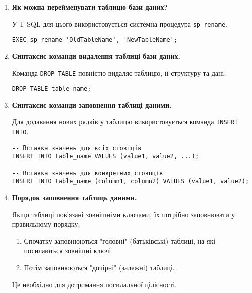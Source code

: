 \documentclass{article}
\begin{document}
\begin{enumerate}[label=\arabic*., leftmargin=*]
        \item \textbf{Як можна перейменувати таблицю бази даних?}

        У T-SQL для цього використовується системна процедура \texttt{sp\_rename}.
        \begin{CodeBox}[Синтаксис]
        \begin{verbatim}
EXEC sp_rename 'OldTableName', 'NewTableName';
        \end{verbatim}
        \end{CodeBox}
        
        \item \textbf{Синтаксис команди видалення таблиці бази даних.}

        Команда \texttt{DROP TABLE} повністю видаляє таблицю, її структуру та дані.
        \begin{CodeBox}[Синтаксис]
        \begin{verbatim}
DROP TABLE table_name;
        \end{verbatim}
        \end{CodeBox}
        
        \item \textbf{Синтаксис команди заповнення таблиці даними.}

        Для додавання нових рядків у таблицю використовується команда \texttt{INSERT INTO}.
        \begin{CodeBox}[Синтаксис]
        \begin{verbatim}
-- Вставка значень для всіх стовпців
INSERT INTO table_name VALUES (value1, value2, ...);

-- Вставка значень для конкретних стовпців
INSERT INTO table_name (column1, column2) VALUES (value1, value2);
        \end{verbatim}
        \end{CodeBox}
        
        \item \textbf{Порядок заповнення таблиць даними.}

        Якщо таблиці пов'язані зовнішніми ключами, їх потрібно заповнювати у правильному порядку:
        \begin{enumerate}
            \item Спочатку заповнюються "головні" (батьківські) таблиці, на які посилаються зовнішні ключі.
            \item Потім заповнюються "дочірні" (залежні) таблиці.
        \end{enumerate}
        Це необхідно для дотримання посилальної цілісності.
        

\end{enumerate}
\end{document}
